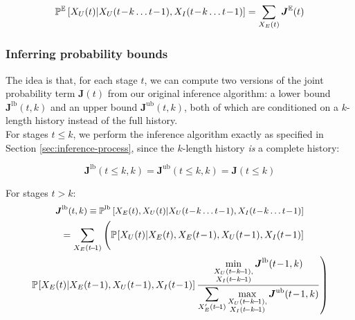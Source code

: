 \documentclass[10pt]{article}
\newcommand{\X}{\mathcal{X}}
\newcommand{\PP}[2][]{\mathbb{P\!}_{#1}\left[#2\right]}
\newcommand{\PPe}[2][]{\mathbb{P}^\mathbb{E}_{#1}\left[#2\right]}
\newcommand{\PPlb}[2][]{\mathbb{P}^\text{lb}_{#1}\left[#2\right]}
\begin{document}
{%
\begin{multline}
\PPe{X_{U}(t)|X_{U}(t\!-\!k\ldots t\!-\!1),X_{I}(t\!-\!k\ldots t\!-\!1)} = 
\sum_{X_{E}(t)} 
\boldsymbol{J}^\mathbb{E}(t)
\label{eq:cpt-after-marginalization-expected}
\hfill
\end{multline}
}

\subsubsection{Inferring probability bounds}
\label{sec:inferring-bounds}

The idea is that, for each stage $t$, we can compute two versions of the joint probability term $\boldsymbol{J}(t)$ from our original inference algorithm: a lower bound $\boldsymbol{J}^\text{lb}(t,k)$ and an upper bound $\boldsymbol{J}^\text{ub}(t,k)$, both of which are conditioned on a $k$-length history instead of the full history.\\

\noindent For stages $t\leq k$, we perform the inference algorithm exactly as specified in Section \ref{sec:inference-process}, since the $k$-length history \emph{is} a complete history:

\begin{equation}
 \boldsymbol{J}^\text{lb}(t\leq k,k)=\boldsymbol{J}^\text{ub}(t\leq k,k)=\boldsymbol{J}(t\leq k)
 \label{eq:approximate-inference-base-stages}
\end{equation}

\noindent For stages $t>k$:
\begin{multline}
\small
\boldsymbol{J}^\text{lb}(t,k)\equiv \PPlb{X_{E}(t),X_{U}(t)|X_{U}(t\!-\!k\ldots t\!-\!1),X_{I}(t\!-\!k\ldots t\!-\!1)}\\
\shoveleft
{
\quad\quad\,\,\,
=\sum_{X_{E}(t\!-\!1)}
\Bigg(
\PP{X_{U}(t)|X_{E}(t),X_{E}(t\!-\!1),X_{U}(t\!-\!1),X_{I}(t\!-\!1)}
}
\\
\left.
\PP{X_{E}(t)|X_{E}(t\!-\!1),X_{U}(t\!-\!1),X_{I}(t\!-\!1)}
\frac{
\displaystyle\min_{\substack{X_{U}(t\!-k\!-\!1),\\X_{I}(t\!-k\!-\!1)}} \boldsymbol{J}^\text{lb}(t\!-\!1,k)
}{
  \displaystyle\sum_{X_{E}'(t\!-\!1)} 
  \displaystyle\max_{\substack{X_{U}(t\!-k\!-\!1),\\X_{I}(t\!-k\!-\!1)}} \boldsymbol{J}^\text{ub}(t\!-\!1,k) 
}
\right)%
\label{eq:joint-min}
\end{multline}
\end{document}
